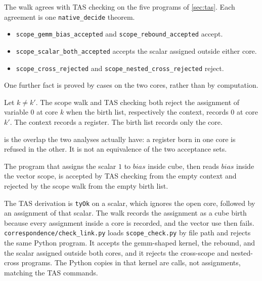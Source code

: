 \documentclass[a4paper,UKenglish,anonymous,cleveref,autoref]{lipics-v2021}
\begin{document}
The walk agrees with TAS checking on the five programs of \cref{sec:tas}.
Each agreement is one \texttt{native\_decide} theorem.
\begin{itemize}
\item \texttt{scope\_gemm\_bias\_accepted} and \texttt{scope\_rebound\_accepted} accept.
\item \texttt{scope\_scalar\_both\_accepted} accepts the scalar assigned outside either core.
\item \texttt{scope\_cross\_rejected} and \texttt{scope\_nested\_cross\_rejected} reject.
\end{itemize}
One further fact is proved by cases on the two cores, rather than by computation.

\begin{theorem}
\label{thm:cross}
Let \(k \neq k'\).
The scope walk and TAS checking both reject the assignment of variable \(0\) at core \(k\) when the birth list, respectively the context, records \(0\) at core \(k'\).
The context records a register.
The birth list records only the core.
\end{theorem}

 is the overlap the two analyses actually have: a register born in one core is refused in the other.
It is not an equivalence of the two acceptance sets.

\begin{theorem}
\label{thm:scalar}
The program that assigns the scalar \(1\) to \(\mathit{bias}\) inside cube, then reads \(\mathit{bias}\) inside the vector scope, is accepted by TAS checking from the empty context and rejected by the scope walk from the empty birth list.
\end{theorem}

The TAS derivation is \texttt{tyOk} on a scalar, which ignores the open core, followed by an assignment of that scalar.
The walk records the assignment as a cube birth because every assignment inside a core is recorded, and the vector use then fails.
\texttt{correspondence/check\_link.py} loads \texttt{scope\_check.py} by file path and rejects the same Python program.
It accepts the gemm-shaped kernel, the rebound, and the scalar assigned outside both cores, and it rejects the cross-scope and nested-cross programs.
The Python copies in that kernel are calls, not assignments, matching the TAS commands.
\end{document}
